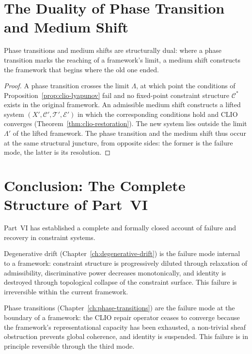 \documentclass[11pt,openany]{book}
\begin{document}
\section{The Duality of Phase Transition and Medium Shift}
\label{sec:duality}

\begin{proposition}
\label{prop:duality}
Phase transitions and medium shifts are structurally dual:
where a phase transition marks the reaching of a
framework's limit, a medium shift constructs the framework
that begins where the old one ended.
\end{proposition}

\begin{proof}
A phase transition crosses the limit $\Lambda$, at which
point the conditions of Proposition~\ref{prop:clio-lyapunov}
fail and no fixed-point constraint structure $\mathcal{C}^*$
exists in the original framework.  An admissible medium
shift constructs a lifted system $(X', \mathcal{C}',
\mathcal{T}', \mathcal{E}')$ in which the corresponding
conditions hold and CLIO converges
(Theorem~\ref{thm:clio-restoration}).  The new system lies
outside the limit $\Lambda'$ of the lifted framework.  The
phase transition and the medium shift thus occur at the
same structural juncture, from opposite sides: the former
is the failure mode, the latter is its resolution.
\end{proof}

\section{Conclusion: The Complete Structure of Part~VI}
\label{sec:conclusion-part-vi}

Part~VI has established a complete and formally closed
account of failure and recovery in constraint systems.

Degenerative drift (Chapter~\ref{ch:degenerative-drift})
is the failure mode internal to a framework: constraint
structure is progressively diluted through relaxation of
admissibility, discriminative power decreases
monotonically, and identity is destroyed through
topological collapse of the constraint surface.  This
failure is irreversible within the current framework.

Phase transitions (Chapter~\ref{ch:phase-transitions})
are the failure mode at the boundary of a framework: the
CLIO repair operator ceases to converge because the
framework's representational capacity has been exhausted,
a non-trivial sheaf obstruction prevents global coherence,
and identity is suspended.  This failure is in principle
reversible through the third mode.
\end{document}
